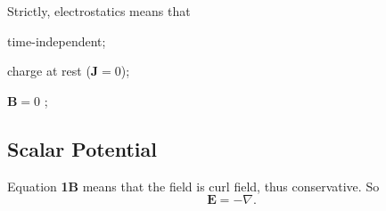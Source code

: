 Strictly, electrostatics means that
\begin{enumerate*}
    \item time-independent;
    \item charge at rest (\(\mathbf{J} = 0\));
    \item \(\mathbf{B} = 0\) ;
\end{enumerate*}
\subsection{Scalar Potential}
Equation \textbf{1B} means that the field is curl field, thus conservative. So
\[
    \mathbf{E} = -\nabla.
\]

